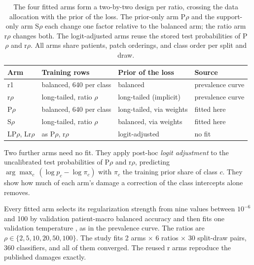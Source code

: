 \documentclass[11pt]{article}
\begin{document}
\begin{table}[htbp]
\centering
\renewcommand{\arraystretch}{1.15}
\begin{tabular}{@{}llll@{}}
\toprule
Arm & Training rows & Prior of the loss & Source \\
\midrule
r1 & balanced, 640 per class & balanced & prevalence curve \\
r$\rho$ & long-tailed, ratio $\rho$ & long-tailed (implicit) & prevalence curve \\
P$\rho$ & balanced, 640 per class & long-tailed, via weights & fitted here \\
S$\rho$ & long-tailed, ratio $\rho$ & balanced, via weights & fitted here \\
LP$\rho$, Lr$\rho$ & as P$\rho$, r$\rho$ & logit-adjusted & no fit \\
\bottomrule
\end{tabular}
\caption{The four fitted arms form a two-by-two design per ratio, crossing the data allocation with the prior of the loss. The prior-only arm P$\rho$ and the support-only arm S$\rho$ each change one factor relative to the balanced arm; the ratio arm r$\rho$ changes both. The logit-adjusted arms reuse the stored test probabilities of P$\rho$ and r$\rho$. All arms share patients, patch orderings, and class order per split and draw.}
\label{tab:arms}
\end{table}

\noindent Two further arms need no fit. They apply post-hoc \emph{logit adjustment} \citep{menon2021longTail} to the uncalibrated test probabilities of P$\rho$ and r$\rho$, predicting $\arg\max_c\,(\log p_c - \log\pi_c)$ with $\pi_c$ the training prior share of class $c$. They show how much of each arm's damage a correction of the class intercepts alone removes.

Every fitted arm selects its regularization strength from nine values between $10^{-6}$ and 100 by validation patient-macro balanced accuracy \citep{queisler2026patientShortage} and then fits one validation temperature \citep{guo2017calibration}, as in the prevalence curve. The ratios are $\rho\in\{2,5,10,20,50,100\}$. The study fits 2 arms $\times$ 6 ratios $\times$ 30 split-draw pairs, 360 classifiers, and all of them converged. The reused r arms reproduce the published damages exactly.
\end{document}
